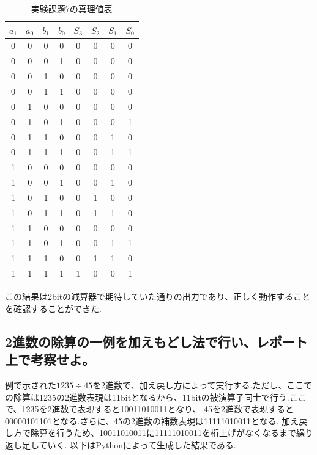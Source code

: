 \documentclass[titlepage]{jsarticle}
\theoremstyle{definition}
\begin{document}
\begin{table}[htbp]
	\caption{実験課題7の真理値表}
	\centering
	\begin{tabular}{|c|c|c|c||c|c|c|c|} \hline
		$a_1$ & $a_0$ & $b_1$ & $b_0$ & $S_3$ & $S_2$ & $S_1$ & $S_0$ \\ \hline \hline
		0 & 0 & 0 & 0 & 0 & 0 & 0 & 0 \\ \hline
		0 & 0 & 0 & 1 & 0 & 0 & 0 & 0 \\ \hline
		0 & 0 & 1 & 0 & 0 & 0 & 0 & 0 \\ \hline
		0 & 0 & 1 & 1 & 0 & 0 & 0 & 0 \\ \hline
		0 & 1 & 0 & 0 & 0 & 0 & 0 & 0 \\ \hline
		0 & 1 & 0 & 1 & 0 & 0 & 0 & 1 \\ \hline
		0 & 1 & 1 & 0 & 0 & 0 & 1 & 0 \\ \hline
		0 & 1 & 1 & 1 & 0 & 0 & 1 & 1 \\ \hline
		1 & 0 & 0 & 0 & 0 & 0 & 0 & 0 \\ \hline
		1 & 0 & 0 & 1 & 0 & 0 & 1 & 0 \\ \hline
		1 & 0 & 1 & 0 & 0 & 1 & 0 & 0 \\ \hline
		1 & 0 & 1 & 1 & 0 & 1 & 1 & 0 \\ \hline
		1 & 1 & 0 & 0 & 0 & 0 & 0 & 0 \\ \hline
		1 & 1 & 0 & 1 & 0 & 0 & 1 & 1 \\ \hline
		1 & 1 & 1 & 0 & 0 & 1 & 1 & 0 \\ \hline
		1 & 1 & 1 & 1 & 1 & 0 & 0 & 1 \\ \hline
	\end{tabular}
\end{table}


この結果は2bitの減算器で期待していた通りの出力であり、正しく動作することを確認することができた.




\subsection{2進数の除算の一例を加えもどし法で行い、レポート上で考察せよ。}
例で示された$1235 \div 45$を2進数で、加え戻し方によって実行する.ただし、ここでの除算は1235の2進数表現は11bitとなるから、11bitの被演算子同士で行う.ここで、1235を2進数で表現すると10011010011となり、
45を2進数で表現すると00000101101となる.さらに、45の2進数の補数表現は11111010011となる.
加え戻し方で除算を行うため、10011010011に11111010011を桁上げがなくなるまで繰り返し足していく.
以下はPythonによって生成した結果である.
\end{document}
